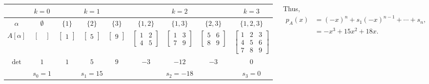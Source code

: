 \documentclass[a0paper, 25pt, portrait]{tikzposter}
\begin{document}
\begin{columns}
{\begin{center}
\begin{tabular}{c|c|ccc|ccc|c}
 & $k = 0$ & \multicolumn{3}{|c|}{$k = 1$} & 
\multicolumn{3}{|c|}{$k = 2$} & $k = 3$ \\
\hline
$\alpha$ & $\emptyset$ & $\{1\}$ & $\{2\}$ & $\{3\}$ &
$\{1,2\}$ & $\{1,3\}$ & $\{2,3\}$ & $\{1,2,3\}$ \\
$A[\alpha]$ & $\begin{bmatrix}~\end{bmatrix}$ &
{\color{red}$\begin{bmatrix}1\end{bmatrix}$} & 
{\color{red}$\begin{bmatrix}5\end{bmatrix}$} &
{\color{red}$\begin{bmatrix}9\end{bmatrix}$} &
{\color{teal}$\begin{bmatrix}1&2\\4&5\end{bmatrix}$} & 
{\color{teal}$\begin{bmatrix}1&3\\7&9\end{bmatrix}$} & 
{\color{teal}$\begin{bmatrix}5&6\\8&9\end{bmatrix}$} & 
            $\begin{bmatrix} 
              1 & 2 & 3 \\
              4 & 5 & 6 \\
              7 & 8 & 9
            \end{bmatrix}$ \\
$\det$ & $1$ & {\color{red}$1$} & {\color{red}$5$} & {\color{red}$9$} &
{\color{teal}$-3$} & {\color{teal}$-12$} & {\color{teal}$-3$} & $0$ \\
\hline
 & $s_0 = 1$ & \multicolumn{3}{|c|}{$s_1 = 15$} & 
\multicolumn{3}{|c|}{$s_2 = -18$} & $s_3 = 0$
\end{tabular}
\end{center}

\bigskip

Thus,  
\[
    \begin{aligned}
      p_A(x) &= (-x)^n + s_1(-x)^{n-1} + \cdots + s_n,
      \\
      &= -x^3 + 15x^2 + 18x.
    \end{aligned}
\]
}
\end{columns}
\end{document}
